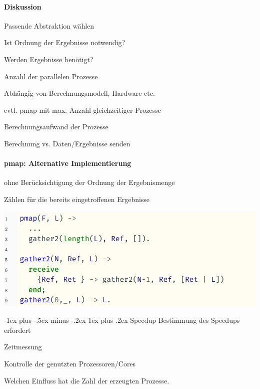 \documentclass[10pt]{article}
\makeatletter
\renewcommand{\subsubsection}{\@startsection{subsubsection}{3}{0mm}%
                                {-1ex plus -.5ex minus -.2ex}%
                                {1ex plus .2ex}%
                                {\normalfont\small\bfseries}}
\makeatother
\begin{document}
  \paragraph{Diskussion}
  
  \begin{itemize*}
    \item Passende Abstraktion wählen
    \begin{itemize*}
      \item Ist Ordnung der Ergebnisse notwendig?
      \item Werden Ergebnisse benötigt?
    \end{itemize*}
    \item Anzahl der parallelen Prozesse
    \begin{itemize*}
      \item Abhängig von Berechnungsmodell, Hardware etc.
      \item evtl. pmap mit max. Anzahl gleichzeitiger Prozesse
    \end{itemize*}
    \item Berechnungsaufwand der Prozesse
    \begin{itemize*}
      \item Berechnung vs. Daten/Ergebnisse senden
    \end{itemize*}
  \end{itemize*}
  
  \paragraph{pmap: Alternative Implementierung}
  
  \begin{itemize*}
    \item ohne Berücksichtigung der Ordnung der Ergebnismenge
    \item Zählen für die bereits eingetroffenen Ergebnisse
  \end{itemize*}
  \begin{center}
    \includegraphics[width=0.4\linewidth]{Assets/Programmierparadigmen-code-snippet-08}
  \end{center}
  
  \subsubsection{Speedup}
  Bestimmung des Speedups erfordert
  \begin{itemize*}
    \item Zeitmessung
    \item Kontrolle der genutzten Prozessoren/Cores
  \end{itemize*}
  \color{orange} Welchen Einfluss hat die Zahl der erzeugten Prozesse. \color{black}
  
\end{document}
